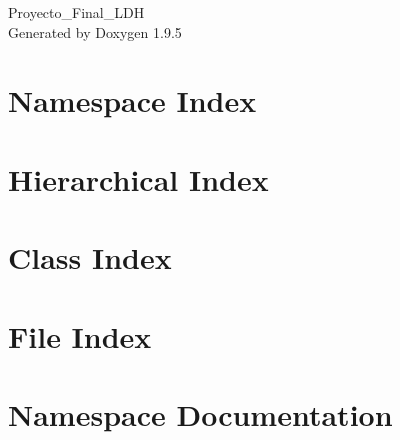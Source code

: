 \documentclass[twoside]{book}
\newcommand{\+}{\discretionary{\mbox{\scriptsize$\hookleftarrow$}}{}{}}
\newcommand{\clearemptydoublepage}{%
    \newpage{\pagestyle{empty}\cleardoublepage}%
  }
\begin{document}
  \raggedbottom
    \hypersetup{pageanchor=false,
                bookmarksnumbered=true,
                pdfencoding=unicode
               }
  \begin{titlepage}
  \vspace*{7cm}
  \begin{center}%
  {\Large Proyecto\+\_\+\+Final\+\_\+\+LDH}\\
  \vspace*{1cm}
  {\large Generated by Doxygen 1.9.5}\\
  \end{center}
  \end{titlepage}
  \clearemptydoublepage
  \tableofcontents
  \clearemptydoublepage
  \hypersetup{pageanchor=true}
\chapter{Namespace Index}

\chapter{Hierarchical Index}

\chapter{Class Index}

\chapter{File Index}

\chapter{Namespace Documentation}








\end{document}
